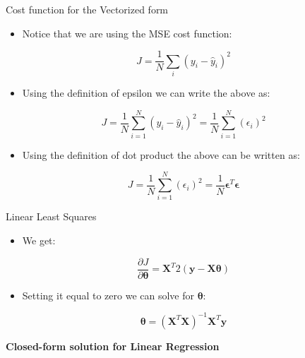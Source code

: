 \begin{frame}{Cost function for the Vectorized form}
\begin{itemize}
    \item Notice that we are using the MSE cost function:
\end{itemize}

\[
J = \frac{1}{N} \sum_i (y_i - \hat{y}_i)^2
\]

\vspace{0.3cm}

\begin{itemize}
    \item Using the definition of epsilon we can write the above as:
\end{itemize}

\[
J = \frac{1}{N} \sum_{i=1}^{N} (y_i - \hat{y}_i)^2 = \frac{1}{N} \sum_{i=1}^{N} (\epsilon_i)^2
\]

\vspace{0.3cm}

\begin{itemize}
    \item Using the definition of dot product the above can be written as:
\end{itemize}

\[
J = \frac{1}{N} \sum_{i=1}^{N} (\epsilon_i)^2 = \frac{1}{N} \boldsymbol{\epsilon}^T \boldsymbol{\epsilon}
\]

\end{frame}


\begin{frame}{Linear Least Squares}
\begin{itemize}
    \item We get:
\end{itemize}

\[
\frac{\partial J}{\partial \boldsymbol{\theta}} = \mathbf{X}^T 2(\mathbf{y} - \mathbf{X} \boldsymbol{\theta})
\]

\vspace{0.3cm}

\begin{itemize}
    \item Setting it equal to zero we can solve for $\boldsymbol{\theta}$:
\end{itemize}

\[
\boxed{\boldsymbol{\theta} = (\mathbf{X}^T \mathbf{X})^{-1} \mathbf{X}^T \mathbf{y}}
\]

\begin{center}
\textbf{Closed-form solution for Linear Regression}
\end{center}

\end{frame}
